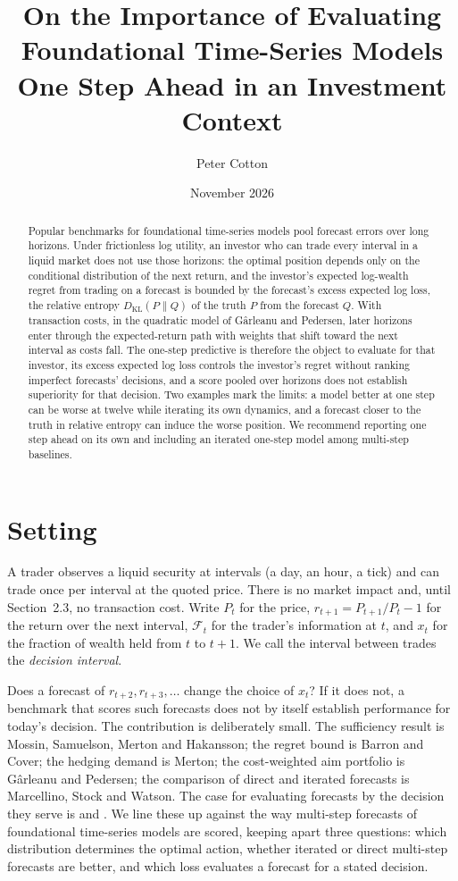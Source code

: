 \documentclass[11pt]{article}
\title{On the Importance of Evaluating Foundational Time-Series Models One Step Ahead in an Investment Context}
\author{Peter Cotton}
\date{November 2026}
\newcommand{\F}{\mathcal{F}}
\begin{document}
\maketitle

\begin{abstract}
Popular benchmarks for foundational time-series models pool forecast errors over long horizons. Under frictionless log utility, an investor who can trade every interval in a liquid market does not use those horizons: the optimal position depends only on the conditional distribution of the next return, and the investor's expected log-wealth regret from trading on a forecast is bounded by the forecast's excess expected log loss, the relative entropy $D_{\mathrm{KL}}(P\|Q)$ of the truth $P$ from the forecast $Q$. With transaction costs, in the quadratic model of G\^arleanu and Pedersen, later horizons enter through the expected-return path with weights that shift toward the next interval as costs fall. The one-step predictive is therefore the object to evaluate for that investor, its excess expected log loss controls the investor's regret without ranking imperfect forecasts' decisions, and a score pooled over horizons does not establish superiority for that decision. Two examples mark the limits: a model better at one step can be worse at twelve while iterating its own dynamics, and a forecast closer to the truth in relative entropy can induce the worse position. We recommend reporting one step ahead on its own and including an iterated one-step model among multi-step baselines.
\end{abstract}

\section{Setting}

A trader observes a liquid security at intervals (a day, an hour, a tick) and can trade once per interval at the quoted price. There is no market impact and, until Section~2.3, no transaction cost. Write $P_t$ for the price, $r_{t+1} = P_{t+1}/P_t - 1$ for the return over the next interval, $\F_t$ for the trader's information at $t$, and $x_t$ for the fraction of wealth held from $t$ to $t+1$. We call the interval between trades the \emph{decision interval}.

Does a forecast of $r_{t+2}, r_{t+3}, \dots$ change the choice of $x_t$? If it does not, a benchmark that scores such forecasts does not by itself establish performance for today's decision. The contribution is deliberately small. The sufficiency result is Mossin, Samuelson, Merton and Hakansson; the regret bound is Barron and Cover; the hedging demand is Merton; the cost-weighted aim portfolio is G\^arleanu and Pedersen; the comparison of direct and iterated forecasts is Marcellino, Stock and Watson. The case for evaluating forecasts by the decision they serve is \citet{granger2000} and \citet{pesaran2002}. We line these up against the way multi-step forecasts of foundational time-series models are scored, keeping apart three questions: which distribution determines the optimal action, whether iterated or direct multi-step forecasts are better, and which loss evaluates a forecast for a stated decision.
\end{document}
